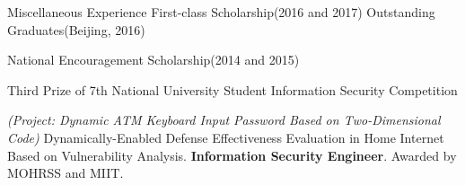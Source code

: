 \begin{rubric}{Miscellaneous Experience}
\entry*[Awards] First-class Scholarship(2016 and 2017)\qquad
Outstanding Graduates(Beijing, 2016)\par
National Encouragement Scholarship(2014 and 2015)\par
Third Prize of 7th National University Student Information Security Competition\par\emph{(Project: Dynamic ATM Keyboard Input Password Based on Two-Dimensional Code)}
\entry*[Thesis] Dynamically-Enabled Defense Effectiveness Evaluation in Home Internet Based on Vulnerability Analysis.
\entry*[Certification] 
\textbf{Information Security Engineer}. Awarded by MOHRSS and MIIT.
\end{rubric}